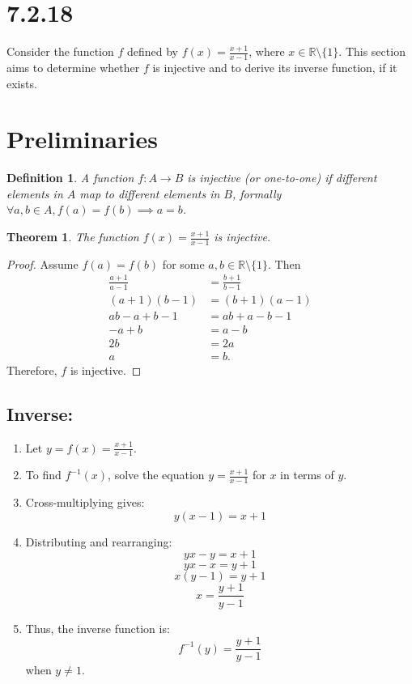 \documentclass[12pt]{article}
\newtheorem{theorem}{Theorem}
\newtheorem{definition}{Definition}
\begin{document}
\section*{7.2.18}
Consider the function \( f \) defined by \( f(x) = \frac{x+1}{x-1} \), where \( x \in \mathbb{R} \setminus \{1\} \). This section aims to determine whether \( f \) is injective and to derive its inverse function, if it exists.

\section*{Preliminaries}
\begin{definition}
A function \( f: A \to B \) is \textit{injective} (or one-to-one) if different elements in \( A \) map to different elements in \( B \), formally \( \forall a, b \in A, f(a) = f(b) \implies a = b \).
\end{definition}

\begin{theorem}
The function \( f(x) = \frac{x+1}{x-1} \) is injective.
\end{theorem}

\begin{proof}
Assume \( f(a) = f(b) \) for some \( a, b \in \mathbb{R} \setminus \{1\} \). Then
\begin{align*}
    \frac{a+1}{a-1} &= \frac{b+1}{b-1} \\
    (a+1)(b-1) &= (b+1)(a-1) \\
    ab - a + b - 1 &= ab + a - b - 1 \\
    -a + b &= a - b \\
    2b &= 2a \\
    a &= b.
\end{align*}
     Therefore,  \( f \) is injective.
\end{proof}

\subsection*{Inverse:}
\begin{enumerate}
    \item Let \( y = f(x) = \frac{x + 1}{x - 1} \).
    \item To find \( f^{-1}(x) \), solve the equation \( y = \frac{x + 1}{x - 1} \) for \( x \) in terms of \( y \).
    \item Cross-multiplying gives:
    \[ y(x - 1) = x + 1 \]
    \item Distributing and rearranging:
    \[ yx - y = x + 1 \]
    \[ yx - x = y + 1 \]
    \[ x(y - 1) = y + 1 \]
    \[ x = \frac{y + 1}{y - 1} \]
    \item Thus, the inverse function is:
    \[ f^{-1}(y) = \frac{y + 1}{y - 1} \] when \( y \neq 1 \).
\end{enumerate}
\end{document}
